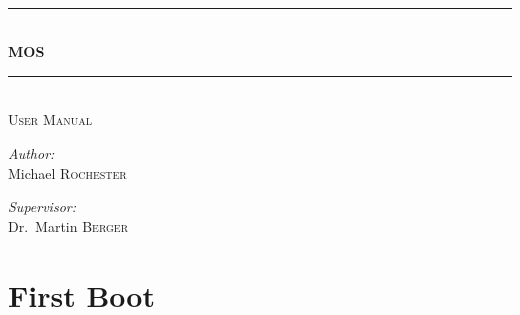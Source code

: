 \documentclass[a4paper]{report}
\begin{document}
\titlespacing*{\chapter}{0pt}{-50pt}{20pt}
\titleformat{\chapter}[display]{\normalfont\huge\bfseries}{\chaptertitlename\ \thechapter}{20pt}{\Huge}


\newcommand{\HRule}{\rule{\linewidth}{0.5mm}}

\begin{titlepage}
\begin{center}

~\\[8cm]


\HRule \\[0.4cm]
{ \huge \bfseries MOS \\[0.4cm] }

\HRule\\[0.8cm]

\textsc{\LARGE User Manual}\\[2cm]


\vfill
\noindent
\begin{minipage}[t]{0.4\textwidth}
\begin{flushleft} \large
\emph{Author:}\\
Michael \textsc{Rochester}
\end{flushleft}
\end{minipage}%
\begin{minipage}[t]{0.4\textwidth}
\begin{flushright} \large
\emph{Supervisor:} \\
Dr.~Martin \textsc{Berger}
\end{flushright}
\end{minipage}



\end{center}
\end{titlepage}

\chapter*{First Boot}
\end{document}

